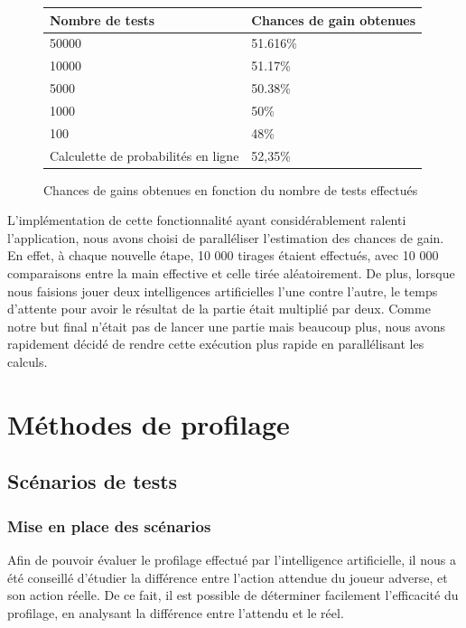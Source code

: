 \documentclass{report}
\begin{document}
\begin{figure}[H]
\begin{center}
\begin{tabular}{|l|l|}
\hline
Nombre de tests & Chances de gain obtenues\\
\hline
50000  & 51.616\%\\
\hline
10000 & 51.17\%\\
\hline
5000 & 50.38\%\\
\hline
1000 & 50\%\\
\hline
100 & 48\%\\
\hline
Calculette de probabilités en ligne & 52,35\%\\
\hline
\end{tabular}
\end{center}
\caption{Chances de gains obtenues en fonction du nombre de tests effectués}
\end{figure}


L'implémentation de cette fonctionnalité ayant considérablement ralenti l'application, nous avons choisi de paralléliser l'estimation des chances de gain. En effet, à chaque nouvelle étape, 10 000 tirages étaient effectués, avec 10 000 comparaisons entre la main effective et celle tirée aléatoirement. De plus, lorsque nous faisions jouer deux intelligences artificielles l'une contre l'autre, le temps d'attente pour avoir le résultat de la partie était multiplié par deux. Comme notre but final n'était pas de lancer une partie mais beaucoup plus, nous avons rapidement décidé de rendre cette exécution plus rapide en parallélisant les calculs.\par

\chapter{Méthodes de profilage}

\section{Scénarios de tests}

\subsection{Mise en place des scénarios}

\hspace{0.5cm}Afin de pouvoir évaluer le profilage effectué par l'intelligence artificielle, il nous a été conseillé d'étudier la différence entre l'action attendue du joueur adverse, et son action réelle. De ce fait, il est possible de déterminer facilement l'efficacité du profilage, en analysant la différence entre l'attendu et le réel.\par
\end{document}
